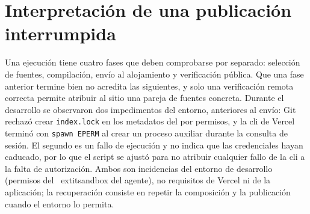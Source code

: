 \section*{Interpretación de una publicación interrumpida}
Una ejecución tiene cuatro fases que deben comprobarse por separado: selección
de fuentes, compilación, envío al alojamiento y verificación pública. Que una
fase anterior termine bien no acredita las siguientes, y solo una verificación
remota correcta permite atribuir al sitio una pareja de fuentes concreta.
Durante el desarrollo se observaron dos impedimentos del entorno, anteriores al
envío: Git rechazó crear \texttt{index.lock} en los metadatos del
 por permisos, y la \acs{cli} de Vercel terminó con
\texttt{spawn EPERM} al crear un proceso auxiliar durante la consulta de
sesión. El segundo es un fallo de ejecución y no indica que las credenciales
hayan caducado, por lo que el script se ajustó para no atribuir cualquier fallo
de la \acs{cli} a la falta de autorización. Ambos son incidencias del entorno
de desarrollo (permisos del \	extit{sandbox} del agente), no requisitos de Vercel
ni de la aplicación; la recuperación consiste en repetir la composición y la
publicación cuando el entorno lo permita.
